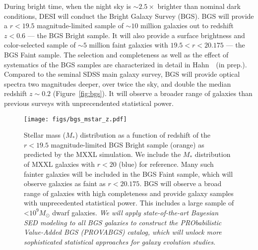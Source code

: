 During bright time, when the night sky is ${\sim}2.5\times$ brighter than
nominal dark conditions, DESI will conduct the Bright Galaxy Survey (BGS).
BGS will provide a $r < 19.5$ magnitude-limited sample of ${\sim}10$ million
galaxies out to redshift $z < 0.6$ --- the BGS Bright sample. 
It will also provide a surface brightness and color-selected sample of 
${\sim}5$ million faint galaxies with $19.5 < r < 20.175$ --- the BGS Faint
sample. 
The selection and completeness as well as the effect of systematics of the BGS
samples are characterized in detail in Hahn~\etal~(in prep.). 
Compared to the seminal SDSS main galaxy survey, BGS will provide optical
spectra two magnitudes deeper, over twice the sky, and double the median
redshift $z{\sim}0.2$ (Figure~\ref{fig:bgs}). 
It will observe a broader range of galaxies than previous surveys with
unprecendented statistical power. 

\begin{figure}
\begin{center}
    \texttt{[image: figs/bgs\_mstar\_z.pdf]}
    \caption{
        Stellar mass ($M_*$) distribution as a function of redshift of the 
        $r < 19.5$ magnitude-limited BGS Bright sample (orange) as predicted by
        the MXXL simulation. 
        We include the $M_*$ distribution of MXXL galaxies with $r < 20$ (blue)
        for reference.
        Many such fainter galaxies will be included in the BGS Faint sample,
        which will observe galaxies as faint as $r < 20.175$. 
        BGS will observe a broad range of galaxies with high completeness and
        provide galaxy samples with unprecedented statistical power.
        This includes a large sample of <$10^9M_\odot$ dwarf galaxies. %
        \emph{We will apply state-of-the-art Bayesian SED modeling to all BGS
        galaxies to construct the PRObabilistic Value-Added BGS (PROVABGS)
        catalog, which will unlock more sophisticated statistical approaches
        for galaxy evolution studies.}}\label{fig:bgs_mstar}
\end{center}
\end{figure}


